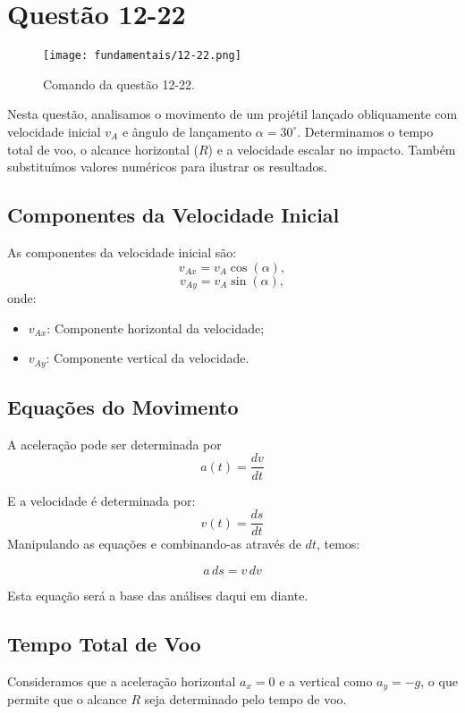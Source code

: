 \newpage
\section{Questão 12-22}

\begin{figure}[H]
	\centering
	\texttt{[image: fundamentais/12-22.png]}
	\caption{Comando da questão 12-22.}\label{fig?:12-22}
\end{figure}

Nesta questão, analisamos o movimento de um projétil lançado obliquamente com velocidade inicial \(v_A\) e ângulo de lançamento \(\alpha = 30^\circ\). Determinamos o tempo total de voo, o alcance horizontal (\(R\)) e a velocidade escalar no impacto. Também substituímos valores numéricos para ilustrar os resultados.

\subsection*{Componentes da Velocidade Inicial}
As componentes da velocidade inicial são:
\[
v_{Ax} = v_A \cos(\alpha),
\]
\[
v_{Ay} = v_A \sin(\alpha),
\]
onde:
\begin{itemize}
    \item \(v_{Ax}\): Componente horizontal da velocidade;
    \item \(v_{Ay}\): Componente vertical da velocidade.
\end{itemize}

\subsection*{Equações do Movimento}
A aceleração pode ser determinada por
\[
a(t) = \frac{dv}{dt}
\]

E a velocidade é determinada por:
\[
v(t) = \frac{ds}{dt}
\]
Manipulando as equações e combinando-as através de \(dt\), temos:

\[
a\,ds = v\,dv 
\]

Esta equação será a base das análises daqui em diante.

\subsection*{Tempo Total de Voo}

Consideramos que a aceleração horizontal \(a_x = 0\) e a vertical como \(a_y = -g\), o que permite que o alcance \(R\) seja determinado pelo tempo de voo.

